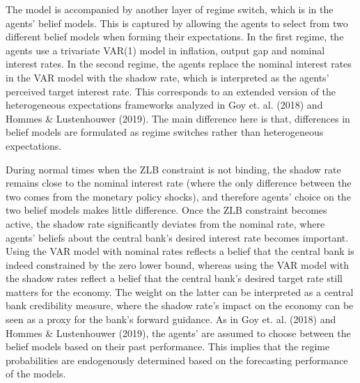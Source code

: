 \documentclass[11pt]{article}
\numberwithin{equation}{section}
\begin{document}
The model is accompanied by another layer of regime switch, which is in the agents' belief models. This is captured by allowing the agents to select from two different belief models when forming their expectations. In the first regime, the agents use a trivariate VAR(1) model in inflation, output gap and nominal interest rates. In the second regime, the agents replace the nominal interest rates in the VAR model with the shadow rate, which is interpreted as the agents' perceived target interest rate. This corresponds to an extended version of the heterogeneous expectations frameworks analyzed in Goy et. al. (2018) and Hommes \& Lustenhouwer (2019). The main difference here is that, differences in belief models are formulated as regime switches rather than heterogeneous expectations.

During normal times when the ZLB constraint is not binding, the shadow rate remains close to the nominal interest rate (where the only difference between the two comes from the monetary policy shocks), and therefore agents' choice on the two belief models makes little difference. Once the ZLB constraint becomes active, the shadow rate significantly deviates from the nominal rate, where agents' beliefs about the central bank's desired interest rate becomes important. Using the VAR model with nominal rates reflects a belief that the central bank is indeed constrained by the zero lower bound, whereas using the VAR model with the shadow rates reflect a belief that the central bank's desired target rate still matters for the economy. The weight on the latter can be interpreted as a central bank credibility measure, where the shadow rate's impact on the economy can be seen as a proxy for the bank's forward guidance. As in Goy et. al. (2018) and Hommes \& Lustenhouwer (2019), the agents' are assumed to choose between the belief models based on their past performance. This implies that the regime probabilities are endogenously determined based on the forecasting performance of the models. 




\end{document}
